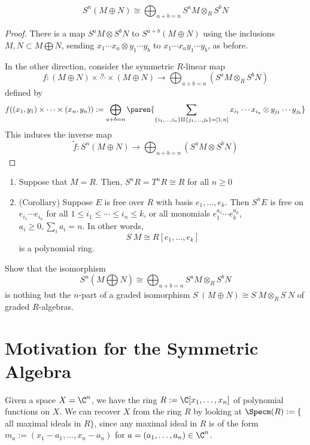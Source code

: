 \begin{prop}
    $$S^n(M \oplus N) \cong \bigoplus_{a+b=n}S^aM \otimes _RS^bN$$
\end{prop}

\begin{proof}
    There is a map $S^aM \otimes S^bN$ to $S^{a+b}(M \oplus N)$ using the inclusions $M,N \subset M \bigoplus N$, sending $x_1\cdots x_a \otimes y_1\cdots y_b$ to $x_1\cdots x_a y_1\cdots y_b$, as before.

    In the other direction, consider the symmetric $R$-linear map
    $$f: (M \oplus N) \times \overset{n}{\cdots} \times (M \oplus N) \to \bigoplus_{a+b=n} (S^aM \otimes _R S^bN)$$
    defined by
    $$f((x_1,y_1)\times \cdots \times (x_n,y_n)) := \bigoplus_{a+b=n}\paren{\sum_{\{ i_1,\dots, i_a \}\amalg \{ j_1,\dots,j_b\} =[1,n] } x_{i_1} \cdots x_{i_a} \otimes y_{j_1}\cdots y_{j_b}}$$
    This induces the inverse map
    $$\tilde f : S^n(M \oplus N) \to \bigoplus_{a+b = n}(S^aM \otimes S^bN)$$
\end{proof}

\begin{ex}
    \begin{enumerate}
        \item Suppose that $M =R$. Then, $S^nR = T^nR \cong R$ for all $n \geq 0$
        \item (Corollary) Suppose $E$ is free over $R$ with basis $e_1,\dots,e_k$. Then $S^nE$ is free on $e_{i_1}\cdots e_{i_n}$ for all $1 \leq i_1 \leq \cdots \leq i_n \leq k$, or all monomials $e_1^{a_1}\cdots e_k^{a_k}$, $a_i \geq 0, \sum_{i}a_i =n$. In other words,
        $$S^\cdot M \cong R [e_1,\dots,e_k]$$
        is a polynomial ring.
    \end{enumerate}
\end{ex}

\begin{notebox*}[Exercise]
    Show that the isomorphism
    $$S^n (M \bigoplus N) \cong \bigoplus_{a+b=n}S^aM \otimes _R S^bN$$
    is nothing but the $n$-part of a graded isomorphism $S^\cdot (M \oplus N) \cong S^\cdot M \otimes _R S^\cdot N$ of graded $R$-algebras.
\end{notebox*}

\section{Motivation for the Symmetric Algebra}

Given a space $X = \C^n$, we have the ring $R:= \C [x_1,\dots,x_n]$ of polynomial functions on $X$. We can recover $X$ from the ring $R$ by looking at $\Specm (R):= \{$all maximal ideals in $R\}$, since any maximal ideal in $R$ is of the form $m_a := (x_1-a_1,\dots,x_n-a_n)$ for $a = (a_1,\dots,a_n) \in \C^n$.

